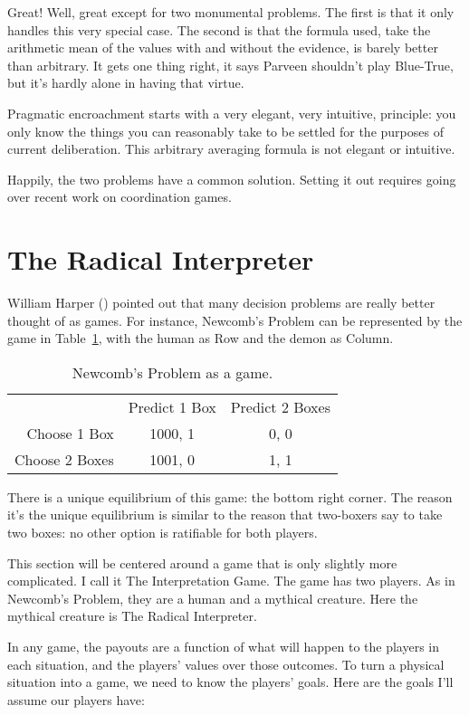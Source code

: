 \documentclass[
  10pt,
  letterpaper,
  twoside]{scrbook}
\begin{document}
Great! Well, great except for two monumental problems. The first is that
it only handles this very special case. The second is that the formula
used, take the arithmetic mean of the values with and without the
evidence, is barely better than arbitrary. It gets one thing right, it
says Parveen shouldn't play Blue-True, but it's hardly alone in having
that virtue.

Pragmatic encroachment starts with a very elegant, very intuitive,
principle: you only know the things you can reasonably take to be
settled for the purposes of current deliberation. This arbitrary
averaging formula is not elegant or intuitive.

Happily, the two problems have a common solution. Setting it out
requires going over recent work on coordination games.

\section{The Radical Interpreter}\label{sec-radicalinterpretation}

William Harper () pointed out that many
decision problems are really better thought of as games. For instance,
Newcomb's Problem can be represented by the game in
Table~\ref{tbl-Newcomb}, with the human as Row and the demon as Column.

\begin{longtable}[]{@{}rcc@{}}
\caption{Newcomb's Problem as a game.}\label{tbl-Newcomb}\tabularnewline
\toprule\noalign{}
\endfirsthead
\endhead
\bottomrule\noalign{}
\endlastfoot
& Predict 1 Box & Predict 2 Boxes \\
Choose 1 Box & 1000, 1 & 0, 0 \\
Choose 2 Boxes & 1001, 0 & 1, 1 \\
\end{longtable}

There is a unique equilibrium of this game: the bottom right corner. The
reason it's the unique equilibrium is similar to the reason that
two-boxers say to take two boxes: no other option is ratifiable for both
players.

This section will be centered around a game that is only slightly more
complicated. I call it The Interpretation Game. The game has two
players. As in Newcomb's Problem, they are a human and a mythical
creature. Here the mythical creature is The Radical Interpreter.

In any game, the payouts are a function of what will happen to the
players in each situation, and the players' values over those outcomes.
To turn a physical situation into a game, we need to know the players'
goals. Here are the goals I'll assume our players have:
\end{document}

